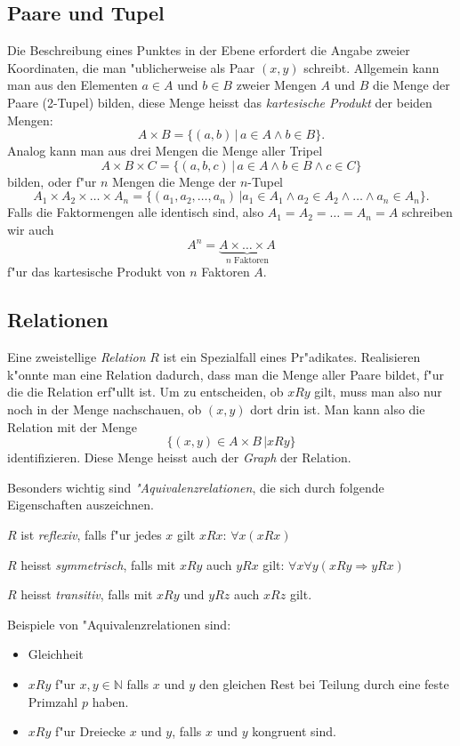 \subsection{Paare und Tupel}
Die Beschreibung eines Punktes in der Ebene erfordert die Angabe zweier
Koordinaten, die man "ublicherweise als Paar $(x,y)$ schreibt. Allgemein
kann man aus den Elementen $a\in A$ und $b\in B$ zweier Mengen $A$ und $B$
die Menge der Paare (2-Tupel) bilden, diese Menge heisst das
{\em kartesische Produkt} der beiden Mengen:
\[
A\times B = \{(a,b)\,|\,a\in A\wedge b\in B\}.
\]
Analog kann man aus drei Mengen die Menge aller Tripel
\[
A\times B\times C=\{(a,b,c)\,|\,a\in A\wedge b\in B\wedge c\in C\}
\]
bilden, oder f"ur $n$ Mengen die Menge der $n$-Tupel
\[
A_1\times A_2\times\dots\times A_n
=\{(a_1,a_2,\dots,a_n)\,|a_1\in A_1\wedge a_2\in A_2\wedge\dots\wedge a_n\in A_n\}.
\]
Falls die Faktormengen alle identisch sind, also $A_1=A_2=\dots=A_n=A$
schreiben wir auch
\[
A^n= \underbrace{A\times \dots \times A}_{\text{$n$ Faktoren}}
\]
f"ur das kartesische Produkt von $n$ Faktoren $A$.

\subsection{Relationen}
Eine zweistellige {\em Relation} $R$ ist ein Spezialfall eines Pr"adikates.
Realisieren k"onnte man eine Relation dadurch, dass man die Menge
aller Paare bildet, f"ur die die Relation erf"ullt ist. Um zu entscheiden,
ob $xRy$ gilt, muss man also nur noch in der Menge nachschauen,
ob $(x,y)$ dort drin ist. Man kann also die Relation mit der
Menge
\[
\{(x,y)\in A\times B\,| xRy\}
\]
identifizieren.
Diese Menge heisst auch der {\em Graph} der Relation.

Besonders wichtig sind {\em "Aquivalenzrelationen}, die sich durch folgende
Eigenschaften auszeichnen.
\begin{compactenum}
\item $R$ ist {\em reflexiv}, falls f"ur jedes $x$ gilt $xRx$: $\forall x(xRx)$
\item $R$ heisst {\em symmetrisch}, falls mit $xRy$ auch $yRx$ gilt: $\forall x\forall y(xRy\Rightarrow yRx)$
\item $R$ heisst {\em transitiv}, falls mit $xRy$ und $yRz$ auch $xRz$ gilt.
\end{compactenum}
Beispiele von "Aquivalenzrelationen sind:
\begin{itemize}
\item Gleichheit
\item $xRy$ f"ur $x,y\in\mathbb N$ falls $x$ und $y$ den gleichen
Rest bei Teilung durch eine feste Primzahl $p$ haben.
\item $xRy$ f"ur Dreiecke $x$ und $y$, falls $x$ und $y$ kongruent sind.
\end{itemize}

